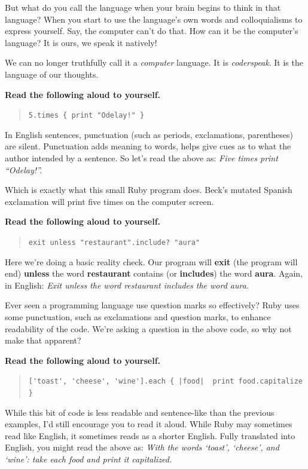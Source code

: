 \documentclass[10pt,twoside]{report}
\begin{document}
But what do you call the language when your brain begins to think in
that language?  When you start to use the language's own words and
colloquialisms to express yourself.  Say, the computer can't do that.
How can it be the computer's language?  It is ours, we speak it
natively!

We can no longer truthfully call it a {\em computer} language.  It is
{\em coderspeak}.  It is the language of our thoughts.

{\bf Read the following aloud to yourself.}

\begin{quote}
\lstinline[breaklines=true]|5.times { print "Odelay!" }|\end{quote}


In English sentences, punctuation (such as periods, exclamations,
parentheses) are silent.  Punctuation adds meaning to words, helps
give cues as to what the author intended by a sentence.  So let's read
the above as: {\em Five times print ``Odelay!''.}

Which is exactly what this small Ruby program does.  Beck's mutated
Spanish exclamation will print five times on the computer screen.

\newpage

{\bf Read the following aloud to yourself.}

\begin{quote}
\lstinline[breaklines=true]|exit unless "restaurant".include? "aura"|\end{quote}


Here we're doing a basic reality check.  Our program will {\bf exit}
(the program will end) {\bf unless} the word {\bf restaurant} contains
(or {\bf includes}) the word {\bf aura}.  Again, in English: {\em Exit
  unless the word restaurant includes the word aura.}

Ever seen a programming language use question marks so effectively?
Ruby uses some punctuation, such as exclamations and question marks,
to enhance readability of the code.  We're asking a question in the
above code, so why not make that apparent?

{\bf Read the following aloud to yourself.}

\begin{quote}
\lstinline[breaklines=true]$['toast', 'cheese', 'wine'].each { |food|  print food.capitalize }$\end{quote}


While this bit of code is less readable and sentence-like than the
previous examples, I'd still encourage you to read it aloud.  While
Ruby may sometimes read like English, it sometimes reads as a shorter
English.  Fully translated into English, you might read the above as:
{\em With the words `toast', `cheese', and `wine': take each food and
  print it capitalized.}
\end{document}
